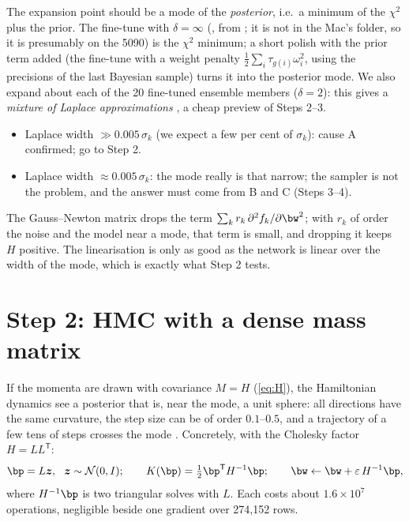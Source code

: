 \begin{assume}
The expansion point should be a mode of the \emph{posterior}, i.e.\ a minimum of the
$\chi^2$ plus the prior. The fine-tune with $\delta = \infty$ (, from
; it is not in the Mac's  folder, so it is
presumably on the 5090) is the $\chi^2$ minimum; a short polish with the prior term added (the fine-tune with a weight
penalty $\tfrac12\sum_i \tau_{g(i)}\omega_i^2$, using the precisions of the last
Bayesian sample) turns it into the posterior mode. We also expand about each of the 20
fine-tuned ensemble members ($\delta = 2$): this gives a \emph{mixture of Laplace
approximations} \cite{Eschenhagen:2021}, a cheap preview of Steps 2--3.
\end{assume}

\begin{keyidea}
\begin{itemize}
  \item Laplace width $\gg 0.005\,\sigma_k$ (we expect a few per cent of $\sigma_k$):
    cause A confirmed; go to Step 2.
  \item Laplace width $\approx 0.005\,\sigma_k$: the mode really is that narrow; the
    sampler is not the problem, and the answer must come from B and C (Steps 3--4).
\end{itemize}
\end{keyidea}

\begin{watch}
The Gauss--Newton matrix drops the term $\sum_k r_k\,\partial^2 f_k/\partial\bw^2$; with
$r_k$ of order the noise and the model near a mode, that term is small, and dropping it
keeps $H$ positive. The linearisation is only as good as the network is linear over the
width of the mode, which is exactly what Step 2 tests.
\end{watch}

\section{Step 2: HMC with a dense mass matrix}
\label{sec:dense}

If the momenta are drawn with covariance $M = H$ (\cref{eq:H}), the Hamiltonian dynamics
see a posterior that is, near the mode, a unit sphere: all directions have the same
curvature, the step size can be of order $0.1$--$0.5$, and a trajectory of a few tens of
steps crosses the mode \cite{Neal:2011,Betancourt:2017}. Concretely, with the Cholesky
factor $H = LL^{\mathsf T}$:
\begin{equation}
  \bp = L\boldsymbol{z},\ \ \boldsymbol{z} \sim \mathcal{N}(0, I); \qquad
  K(\bp) = \tfrac12 \bp^{\mathsf T} H^{-1} \bp; \qquad
  \bw \leftarrow \bw + \varepsilon\, H^{-1}\bp ,
\end{equation}
where $H^{-1}\bp$ is two triangular solves with $L$. Each costs about $1.6\times10^7$
operations, negligible beside one gradient over 274,152 rows.

